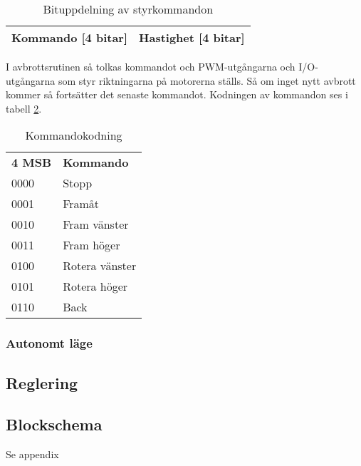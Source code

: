 \begin{table}[h] 
        \label{styrbitar}
        \begin{center}
                \begin{tabular}{| c | c |}
                        \hline
                        Kommando [4 bitar] & Hastighet [4 bitar] \\ \hline
                \end{tabular}
        \end{center}
        \caption{Bituppdelning av styrkommandon}
\end{table}
I avbrottsrutinen så tolkas kommandot och PWM-utgångarna och I/O-utgångarna som styr riktningarna på motorerna ställs.
Så om inget nytt avbrott kommer så fortsätter det senaste kommandot.
Kodningen av kommandon ses i tabell \ref{kodning}.
\begin{table}[h] 
        \label{kodning}
        \begin{tabular}{l l}
                \textbf{4 MSB} & \textbf{Kommando} \\
                0000 & Stopp \\
                0001 & Framåt \\
                0010 & Fram vänster \\
                0011 & Fram höger \\
                0100 & Rotera vänster \\
                0101 & Rotera höger \\
                0110 & Back \\
        \end{tabular}
        \caption{Kommandokodning}
\end{table}


\subsubsection{Autonomt läge}
\subsection{Reglering}
\subsection{Blockschema}
Se appendix %
